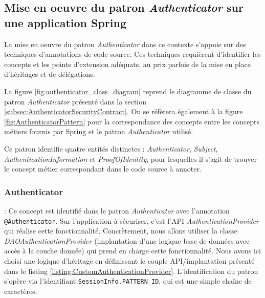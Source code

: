 \subsection{Mise en oeuvre du patron \textit{Authenticator} sur une application Spring}


La mise en oeuvre du patron \textit{Authenticator} dans ce contexte s'appuie sur des techniques d'annotations de code source. Ces techniques requièrent d'identifier les concepts et les points d'extension adéquats, au prix parfois de la mise en place d'héritages et de délégations.

La figure \ref{fig:authenticator_class_diagram} reprend le diagramme de classe du patron \textit{Authenticator} présenté dans la section \ref{subsec:AuthenticatorSecurityContract}. On se réfèrera également à la figure \ref{fig:AuthenticatorPattern} pour la correspondance des concepts entre les concepts métiers fournis par Spring et le patron \textit{Authenticator} utilisé.

Ce patron identifie quatre entités distinctes : \textit{Authenticator}, \textit{Subject}, \textit{AuthenticationInformation} et \textit{ProofOfIdentity}, pour lesquelles il s'agit de trouver le concept métier correspondant dans le code source à annoter.

\subsubsection{Authenticator} : Ce concept est identifié dans le patron \textit{Authenticator} avec l'annotation \texttt{@Authenticator}. Sur l'application à sécuriser, c'est l'API \textit{AuthenticationProvider} qui réalise cette fonctionnalité. Concrètement, nous allons utiliser la classe \textit{DAOAuthenticationProvider} (implantation d'une logique base de données avec accès à la couche donnée) qui prend en charge cette fonctionnalité. Nous avons ici choisi une logique d'héritage en définissant le couple API/implantation présenté dans le listing \ref{listing:CustomAuthenticationProvider}. L'identification du patron s'opère via l'identifiant \texttt{SessionInfo.PATTERN\_ID}, qui est une simple chaîne de caractères.

